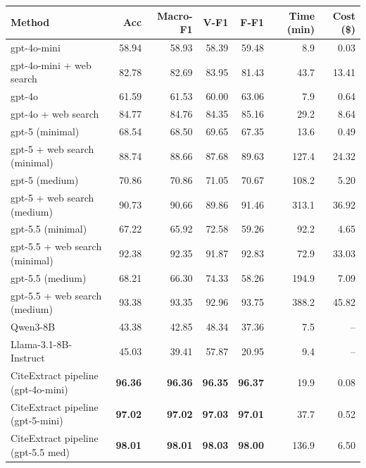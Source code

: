 \begin{tabular}{lrrrrrr}
\toprule
Method & Acc & Macro-F1 & V-F1 & F-F1 & Time (min) & Cost (\$) \\
\midrule
gpt-4o-mini & 58.94 & 58.93 & 58.39 & 59.48 & 8.9 & 0.03 \\
gpt-4o-mini + web search & 82.78 & 82.69 & 83.95 & 81.43 & 43.7 & 13.41 \\
gpt-4o & 61.59 & 61.53 & 60.00 & 63.06 & 7.9 & 0.64 \\
gpt-4o + web search & 84.77 & 84.76 & 84.35 & 85.16 & 29.2 & 8.64 \\
gpt-5 (minimal) & 68.54 & 68.50 & 69.65 & 67.35 & 13.6 & 0.49 \\
gpt-5 + web search (minimal) & 88.74 & 88.66 & 87.68 & 89.63 & 127.4 & 24.32 \\
gpt-5 (medium) & 70.86 & 70.86 & 71.05 & 70.67 & 108.2 & 5.20 \\
gpt-5 + web search (medium) & 90.73 & 90.66 & 89.86 & 91.46 & 313.1 & 36.92 \\
gpt-5.5 (minimal) & 67.22 & 65.92 & 72.58 & 59.26 & 92.2 & 4.65 \\
gpt-5.5 + web search (minimal) & 92.38 & 92.35 & 91.87 & 92.83 & 72.9 & 33.03 \\
gpt-5.5 (medium) & 68.21 & 66.30 & 74.33 & 58.26 & 194.9 & 7.09 \\
gpt-5.5 + web search (medium) & 93.38 & 93.35 & 92.96 & 93.75 & 388.2 & 45.82 \\
Qwen3-8B & 43.38 & 42.85 & 48.34 & 37.36 & 7.5 & -- \\
Llama-3.1-8B-Instruct & 45.03 & 39.41 & 57.87 & 20.95 & 9.4 & -- \\
CiteExtract pipeline (gpt-4o-mini) & \textbf{96.36} & \textbf{96.36} & \textbf{96.35} & \textbf{96.37} & 19.9 & 0.08 \\
CiteExtract pipeline (gpt-5-mini) & \textbf{97.02} & \textbf{97.02} & \textbf{97.03} & \textbf{97.01} & 37.7 & 0.52 \\
CiteExtract pipeline (gpt-5.5 med) & \textbf{98.01} & \textbf{98.01} & \textbf{98.03} & \textbf{98.00} & 136.9 & 6.50 \\
\bottomrule
\end{tabular}
